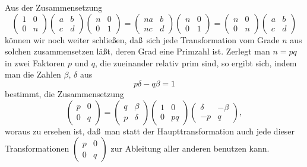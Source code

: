 \documentclass[12pt,a4paper]{article}
\begin{document}
\newpage
\noindent
Aus der Zusammensetzung
\begin{equation}\label{eq:29_7}
\begin{pmatrix} 1 & 0 \\ 0 & n \end{pmatrix}\begin{pmatrix} a & b \\ c & d \end{pmatrix}\begin{pmatrix} n & 0 \\ 0 & 1 \end{pmatrix} = \begin{pmatrix} na & b \\ nc & d \end{pmatrix}\begin{pmatrix} n & 0 \\ 0 & 1 \end{pmatrix} = \begin{pmatrix} n & 0 \\ 0 & n \end{pmatrix}\begin{pmatrix} a & b \\ c & d \end{pmatrix}
\end{equation}
k\"onnen wir noch weiter schlie\ss en, da\ss\ sich jede Transformation vom Grade $n$ aus solchen zusammensetzen l\"a\ss t, deren Grad eine Primzahl ist. Zerlegt man $n=pq$ in zwei Faktoren $p$ und $q$, die zueinander relativ prim sind, so ergibt sich, indem man die Zahlen $\beta$, $\delta$ aus
\[
p\delta-q\beta=1
\]
bestimmt, die Zusammensetzung
\[
\begin{pmatrix} p & 0 \\ 0 & q \end{pmatrix} = \begin{pmatrix} q & \beta \\ p & \delta \end{pmatrix}\begin{pmatrix} 1 & 0 \\ 0 & pq \end{pmatrix}\begin{pmatrix} \delta & -\beta \\ -p & q \end{pmatrix},
\]
woraus zu ersehen ist, da\ss\ man statt der Haupttransformation auch jede dieser Transformationen $\begin{pmatrix}p&0\\0&q\end{pmatrix}$ zur Ableitung aller anderen benutzen kann.
\end{document}
